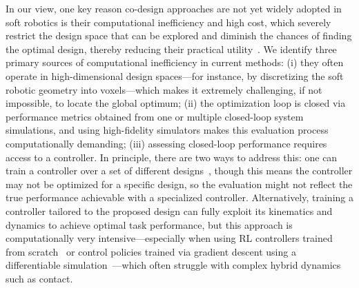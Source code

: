 In our view, one key reason co-design approaches are not yet widely adopted in soft robotics is their computational inefficiency and high cost, which severely restrict the design space that can be explored and diminish the chances of finding the optimal design, thereby reducing their practical utility~\citep{chen2020design}. We identify three primary sources of computational inefficiency in current methods: (i) they often operate in high-dimensional design spaces—for instance, by discretizing the soft robotic geometry into voxels—which makes it extremely challenging, if not impossible, to locate the global optimum; (ii) the optimization loop is closed via performance metrics obtained from one or multiple closed-loop system simulations, and using high-fidelity simulators makes this evaluation process computationally demanding; (iii) assessing closed-loop performance requires access to a controller. In principle, there are two ways to address this: one can train a controller over a set of different designs~\citep{zardini2021seeking, boekel2025learning}, though this means the controller may not be optimized for a specific design, so the evaluation might not reflect the true performance achievable with a specialized controller. Alternatively, training a controller tailored to the proposed design can fully exploit its kinematics and dynamics to achieve optimal task performance, but this approach is computationally very intensive—especially when using \gls{RL} controllers trained from scratch~\citep{bhatia2021evolution, wang2022curriculum, wang2023softzoo, wang2023preco} or control policies trained via gradient descent using a differentiable simulation~\citep{spielberg2019learning, bacher2021design, wang2023softzoo, wang2024diffusebot}—which often struggle with complex hybrid dynamics such as contact.

